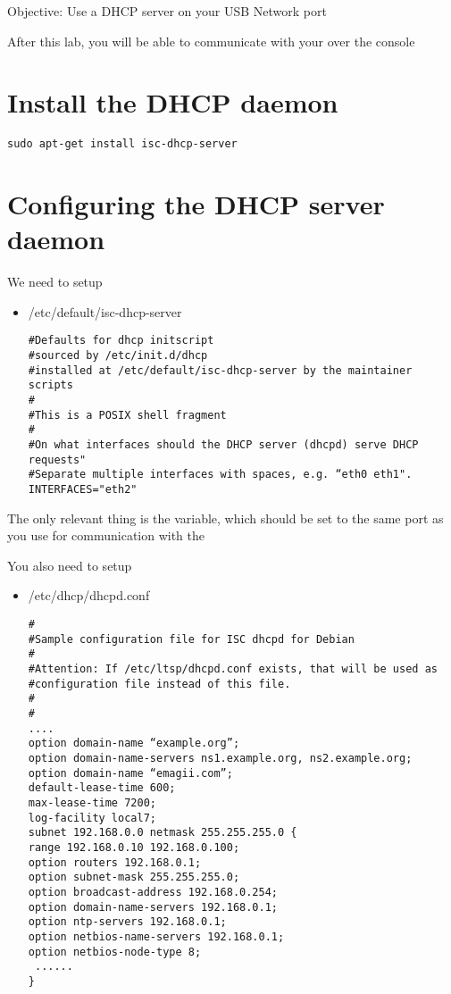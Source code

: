 {Objective: Use a DHCP server on your USB Network port}

After this lab, you will be able to communicate with your \devboard over the console

\section{Install the DHCP daemon}

\begin{verbatim}
sudo apt-get install isc-dhcp-server
\end{verbatim}



\section{Configuring the DHCP server daemon}

We need to setup

\begin{itemize}
\item /etc/default/isc-dhcp-server

\begin{verbatim}
#Defaults for dhcp initscript
#sourced by /etc/init.d/dhcp
#installed at /etc/default/isc-dhcp-server by the maintainer scripts
#
#This is a POSIX shell fragment
#
#On what interfaces should the DHCP server (dhcpd) serve DHCP requests"
#Separate multiple interfaces with spaces, e.g. “eth0 eth1".
INTERFACES="eth2"
\end{verbatim}
\end{itemize}

The only relevant thing is the  variable, which should be set
to the same port as you use for communication with the \devboard

\clearpage

You also need to setup

\begin{itemize}
\item /etc/dhcp/dhcpd.conf

\begin{verbatim}
#
#Sample configuration file for ISC dhcpd for Debian
#
#Attention: If /etc/ltsp/dhcpd.conf exists, that will be used as
#configuration file instead of this file.
#
#
....
option domain-name “example.org”;
option domain-name-servers ns1.example.org, ns2.example.org;
option domain-name “emagii.com”;
default-lease-time 600;
max-lease-time 7200;
log-facility local7;
subnet 192.168.0.0 netmask 255.255.255.0 {
range 192.168.0.10 192.168.0.100;
option routers 192.168.0.1;
option subnet-mask 255.255.255.0;
option broadcast-address 192.168.0.254;
option domain-name-servers 192.168.0.1;
option ntp-servers 192.168.0.1;
option netbios-name-servers 192.168.0.1;
option netbios-node-type 8;
 ......
}
\end{verbatim}
\end{itemize}


